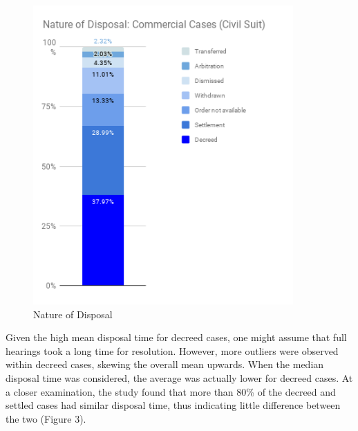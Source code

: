 \documentclass[a4paper, 12pt, twoside]{article}
\begin{document}
\begin{figure}[H] %
\centering
\includegraphics[height = 4.5in]{fig2.png}
\captionsetup{justification=centering}\caption[Optional Caption]{Nature of Disposal\footnotemark}
\end{figure}

Given the high mean disposal time for decreed cases, one might assume that full hearings took a long time for resolution. However, more outliers were observed within decreed cases, skewing the overall mean upwards. When the median disposal time was considered, the average was actually lower for decreed cases. At a closer examination, the study found that more than 80\% of the decreed and settled cases had similar disposal time, thus indicating little difference between the two (Figure 3). 
\end{document}

